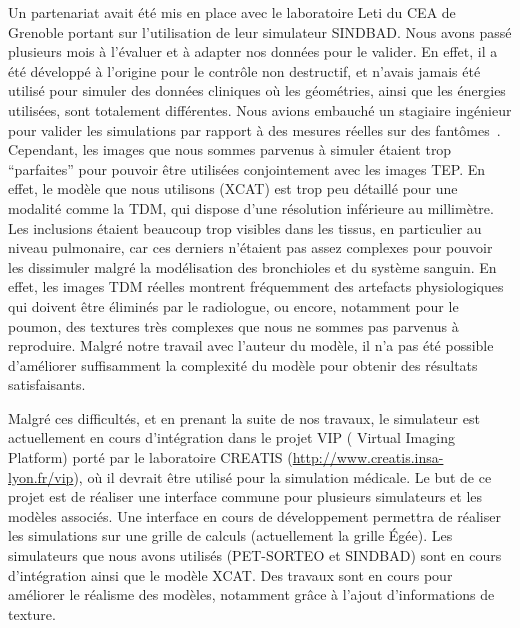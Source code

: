 Un partenariat avait été mis en place avec le laboratoire Leti du CEA de
Grenoble portant sur l'utilisation de leur simulateur SINDBAD. Nous avons passé
plusieurs mois à l'évaluer et à adapter nos données pour le valider. En effet,
il a été développé à l'origine pour le contrôle non destructif, et n'avais
jamais été utilisé pour simuler des données cliniques où les géométries, ainsi
que les énergies utilisées, sont totalement différentes. Nous avions embauché un
stagiaire ingénieur pour valider les simulations par rapport à des mesures
réelles sur des fantômes~\cite{leduvehat}. Cependant, les images que nous sommes parvenus à simuler étaient trop
``parfaites'' pour pouvoir être utilisées conjointement avec les images TEP. En
effet, le modèle que nous utilisons (XCAT) est trop peu détaillé pour une
modalité comme la TDM, qui dispose d'une résolution inférieure au millimètre. Les
inclusions étaient beaucoup trop visibles dans les tissus, en particulier
au niveau pulmonaire, car ces derniers n'étaient pas assez complexes pour
pouvoir les dissimuler malgré la modélisation des bronchioles et du système
sanguin. En effet, les images TDM réelles montrent fréquemment des artefacts
physiologiques qui doivent être éliminés par le radiologue, ou encore,
notamment pour le poumon, des textures très complexes que nous ne sommes pas
parvenus à reproduire. Malgré notre travail avec l'auteur du modèle, il n'a pas
été possible d'améliorer suffisamment la complexité du modèle pour obtenir des
résultats satisfaisants. 

Malgré ces difficultés, et en prenant la suite de nos travaux, le simulateur est
actuellement en cours d'intégration dans le projet  VIP ( Virtual Imaging Platform) porté par le laboratoire CREATIS (\url{http://www.creatis.insa-lyon.fr/vip}), où il devrait être
utilisé pour la simulation médicale. Le but de ce projet est de réaliser
une interface commune pour plusieurs simulateurs et les modèles associés. Une
interface en cours de développement permettra de réaliser les simulations sur
une grille de calculs (actuellement la grille Égée). Les simulateurs que nous
avons utilisés (PET-SORTEO et SINDBAD) sont en cours d'intégration ainsi
que le modèle XCAT. Des travaux sont en cours pour améliorer le réalisme des
modèles, notamment grâce à l'ajout d'informations de texture.  


